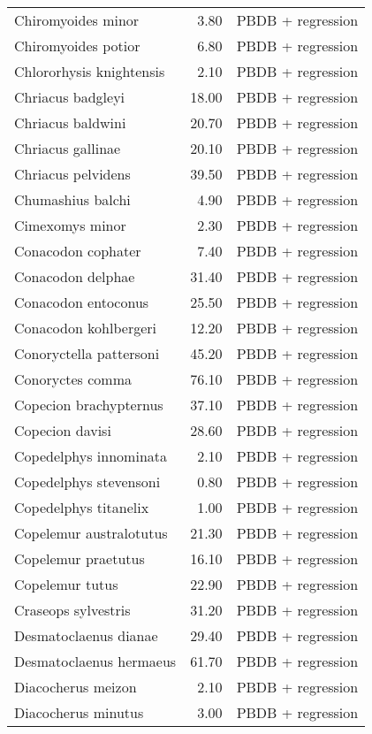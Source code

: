 \begin{table}[ht]
\begin{tabular}{lrl}
  Chiromyoides minor & 3.80 & PBDB + regression \\ 
  Chiromyoides potior & 6.80 & PBDB + regression \\ 
  Chlororhysis knightensis & 2.10 & PBDB + regression \\ 
  Chriacus badgleyi & 18.00 & PBDB + regression \\ 
  Chriacus baldwini & 20.70 & PBDB + regression \\ 
  Chriacus gallinae & 20.10 & PBDB + regression \\ 
  Chriacus pelvidens & 39.50 & PBDB + regression \\ 
  Chumashius balchi & 4.90 & PBDB + regression \\ 
  Cimexomys minor & 2.30 & PBDB + regression \\ 
  Conacodon cophater & 7.40 & PBDB + regression \\ 
  Conacodon delphae & 31.40 & PBDB + regression \\ 
  Conacodon entoconus & 25.50 & PBDB + regression \\ 
  Conacodon kohlbergeri & 12.20 & PBDB + regression \\ 
  Conoryctella pattersoni & 45.20 & PBDB + regression \\ 
  Conoryctes comma & 76.10 & PBDB + regression \\ 
  Copecion brachypternus & 37.10 & PBDB + regression \\ 
  Copecion davisi & 28.60 & PBDB + regression \\ 
  Copedelphys innominata & 2.10 & PBDB + regression \\ 
  Copedelphys stevensoni & 0.80 & PBDB + regression \\ 
  Copedelphys titanelix & 1.00 & PBDB + regression \\ 
  Copelemur australotutus & 21.30 & PBDB + regression \\ 
  Copelemur praetutus & 16.10 & PBDB + regression \\ 
  Copelemur tutus & 22.90 & PBDB + regression \\ 
  Craseops sylvestris & 31.20 & PBDB + regression \\ 
  Desmatoclaenus dianae & 29.40 & PBDB + regression \\ 
  Desmatoclaenus hermaeus & 61.70 & PBDB + regression \\ 
  Diacocherus meizon & 2.10 & PBDB + regression \\ 
  Diacocherus minutus & 3.00 & PBDB + regression \\ 

\end{tabular}
\end{table}
